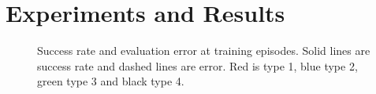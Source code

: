 \section{Experiments and Results}
\begin{figure}
    
    \caption{Success rate and evaluation error at training episodes. Solid lines are success rate and dashed lines are error. Red is type 1, blue type 2, green type 3 and black type 4.}
    \label{fig:learning}
\end{figure}

